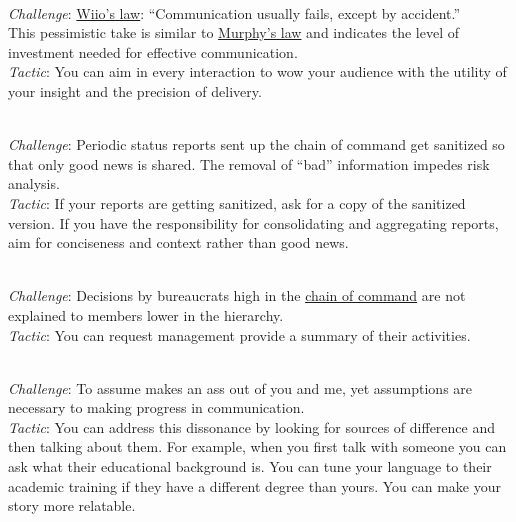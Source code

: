 \ \\
\textit{Challenge}: \href{https://en.wikipedia.org/wiki/Wiio\%27s_laws}{Wiio's law}: 
%
%
%
``Communication usually fails, except by accident.''\\
This pessimistic take is similar to \href{https://en.wikipedia.org/wiki/Murphy\%27s_law}{Murphy's law}
and indicates the level of investment needed for effective communication. \\
\textit{Tactic}: You can aim in every interaction to wow your audience with the utility of your insight and the precision of delivery.


\ \\
\textit{Challenge}: Periodic status reports sent up the chain of command get sanitized so that only good news is shared. The removal of ``bad'' information impedes risk analysis. \\
\textit{Tactic}: If your reports are getting sanitized, ask for a copy of the sanitized version. If you have the responsibility for consolidating and aggregating reports, aim for conciseness and context rather than good news. 

\ \\
\textit{Challenge}: Decisions by bureaucrats high in the \href{https://en.wikipedia.org/wiki/Command_hierarchy}{chain of command}
\iftoggle{WPinmargin}{\marginpar{$>$Wikipedia: Command hierarchy}}{}
are not explained to members lower in the hierarchy. \\
\textit{Tactic}: You can request management provide a summary of their activities.

\ \\
\textit{Challenge}: To assume makes an ass out of you and me, 
%
%
yet assumptions are necessary to making progress in communication.\\ 
\textit{Tactic}: You can address this dissonance by looking for sources of difference and then talking about them. For example, when you first talk with someone you can ask what their educational background is. You can tune your language to their academic training if they have a different degree than yours. You can make your story more relatable. 

